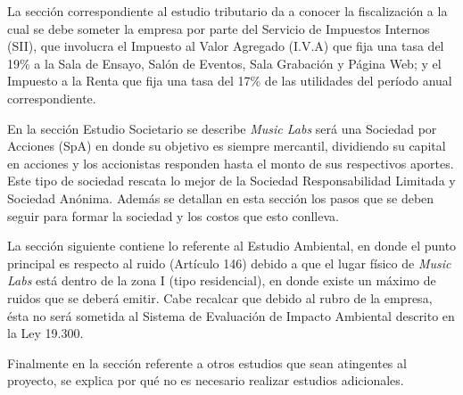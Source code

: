 La sección correspondiente al estudio tributario da a conocer la fiscalización a la cual
se debe someter la empresa por parte del Servicio de Impuestos Internos (SII),
que involucra el Impuesto al Valor Agregado (I.V.A) que fija una tasa del 19\% a la Sala de Ensayo,
Salón de Eventos, Sala Grabación y Página Web; y el Impuesto a la Renta que fija una tasa del 17\%
de las utilidades del período anual correspondiente.

En la sección Estudio Societario se describe \emph{Music Labs} será una Sociedad por Acciones (SpA)
en donde su objetivo es siempre mercantil, dividiendo su capital en acciones y los accionistas
responden hasta el monto de sus respectivos aportes.
Este tipo de sociedad rescata lo mejor de la Sociedad Responsabilidad Limitada y Sociedad Anónima.
Además se detallan en esta sección los pasos que se deben seguir para formar la sociedad y los costos
que esto conlleva.

La sección siguiente contiene lo referente al Estudio Ambiental, en donde el punto principal es
respecto al ruido (Artículo 146) debido a que el lugar físico de \emph{Music Labs} está dentro de la zona
I (tipo residencial), en donde existe un máximo de ruidos que se deberá emitir. Cabe recalcar que debido
 al rubro de la empresa, ésta no será sometida al Sistema de Evaluación
de Impacto Ambiental descrito en la Ley 19.300.

Finalmente en la sección referente a otros estudios que sean atingentes al proyecto, se explica por qué
no es necesario realizar estudios adicionales.
